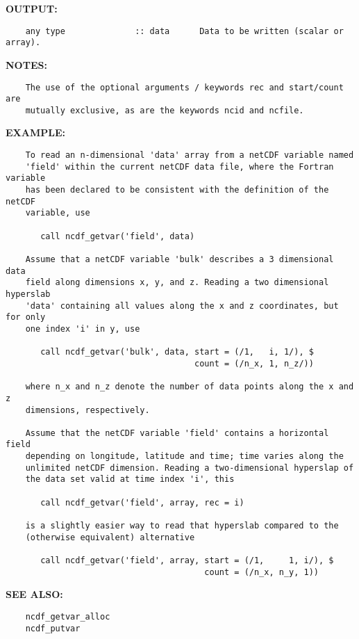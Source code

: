 \textbf{OUTPUT:}\hspace{0.08in}\begin{Verbatim}
    any type              :: data      Data to be written (scalar or array).
\end{Verbatim}
\textbf{NOTES:}\hspace{0.08in}\begin{Verbatim}
    The use of the optional arguments / keywords rec and start/count are
    mutually exclusive, as are the keywords ncid and ncfile.
\end{Verbatim}
\textbf{EXAMPLE:}\hspace{0.08in}\begin{Verbatim}
    To read an n-dimensional 'data' array from a netCDF variable named
    'field' within the current netCDF data file, where the Fortran variable
    has been declared to be consistent with the definition of the netCDF
    variable, use

       call ncdf_getvar('field', data)

    Assume that a netCDF variable 'bulk' describes a 3 dimensional data
    field along dimensions x, y, and z. Reading a two dimensional hyperslab
    'data' containing all values along the x and z coordinates, but for only
    one index 'i' in y, use

       call ncdf_getvar('bulk', data, start = (/1,   i, 1/), $
                                      count = (/n_x, 1, n_z/))

    where n_x and n_z denote the number of data points along the x and z
    dimensions, respectively.

    Assume that the netCDF variable 'field' contains a horizontal field
    depending on longitude, latitude and time; time varies along the
    unlimited netCDF dimension. Reading a two-dimensional hyperslap of
    the data set valid at time index 'i', this

       call ncdf_getvar('field', array, rec = i)

    is a slightly easier way to read that hyperslab compared to the
    (otherwise equivalent) alternative

       call ncdf_getvar('field', array, start = (/1,     1, i/), $
                                        count = (/n_x, n_y, 1))
\end{Verbatim}
\textbf{SEE ALSO:}\hspace{0.08in}\begin{Verbatim}
    ncdf_getvar_alloc
    ncdf_putvar
\end{Verbatim}
